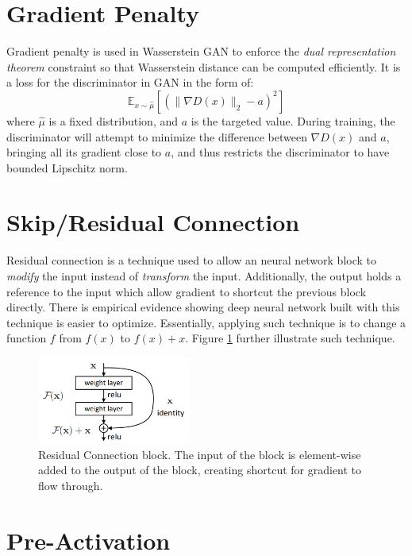 \section{Gradient Penalty}
\label{app:ml:grad_pen}
Gradient penalty is used in Wasserstein GAN to enforce the \textit{dual representation theorem} constraint so that Wasserstein distance can be computed efficiently. It is a loss for the discriminator in GAN in the form of:
$$
\mathbb{E}_{x \sim \hat{\mu}}\left[\left(\|\nabla D(x)\|_{2}-a\right)^{2}\right]
$$
where $\hat{\mu}$ is a fixed distribution, and $a$ is the targeted value. During training, the discriminator will attempt to minimize the difference between $\nabla D(x)$ and $a$, bringing all its gradient close to $a$, and thus restricts the discriminator to have bounded Lipschitz norm.

\section{Skip/Residual Connection}
\label{app:ml:res_conn}
Residual connection is a technique used to allow an neural network block to \textit{modify} the  input instead of \textit{transform} the input. Additionally, the output holds a reference to the input which allow gradient to shortcut the previous block directly. There is empirical evidence showing deep neural network built with this technique is easier to optimize. Essentially, applying such technique is to change a function $f$ from $f(x)$ to $f(x)+x$. Figure \ref{fig:res_conn} further illustrate such technique.

\begin{figure}
    \centering
    \includegraphics[width=0.45\textwidth]{images/preliminary/res_conn.png}
    \caption{Residual Connection block. The input of the block is element-wise added to the output of the block, creating shortcut for gradient to flow through.\cite{heDeepResidualLearning2015a}}
    \label{fig:res_conn}
\end{figure}

\section{Pre-Activation}
\label{app:ml:pre_act}

